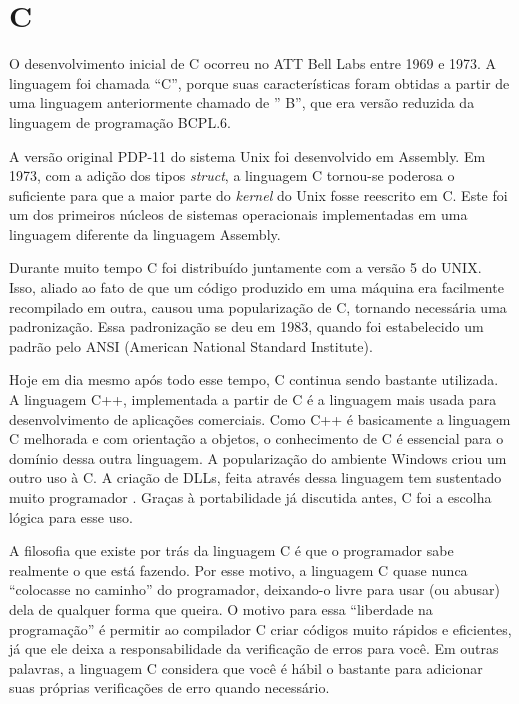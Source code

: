 \documentclass[
    12pt,               %
    openany,            %
    twoside,            %
    a4paper,            %
    brazil              %
    ]{abntex2}
\begin{document}
\chapter{C}

O desenvolvimento inicial de C ocorreu no ATT Bell Labs entre 1969 e 1973. A
linguagem foi chamada “C”, porque suas características foram obtidas a partir
de uma linguagem anteriormente chamado de ” B”, que era versão reduzida da
linguagem de programação BCPL.6.

A versão original PDP-11 do sistema Unix foi desenvolvido em Assembly. Em 1973,
com a adição dos tipos \textit{struct}, a linguagem C tornou-se poderosa o
suficiente para que a maior parte do \textit{kernel} do Unix fosse reescrito em
C. Este foi um dos primeiros núcleos de sistemas operacionais implementadas em
uma linguagem diferente da linguagem Assembly. 

Durante muito tempo C foi distribuído juntamente com a versão 5 do UNIX. Isso,
aliado ao fato de que um código produzido em uma máquina era facilmente
recompilado em outra, causou uma popularização de C, tornando necessária uma
padronização. Essa padronização se deu em 1983, quando foi estabelecido um
padrão pelo ANSI (American National Standard Institute).

Hoje em dia mesmo após todo esse tempo, C continua sendo bastante utilizada. A
linguagem C++, implementada a partir de C é a linguagem mais usada para
desenvolvimento de aplicações comerciais.  Como C++ é basicamente a linguagem C
melhorada e com orientação a objetos, o conhecimento de C é essencial para o
domínio dessa outra linguagem. A popularização do ambiente Windows criou um
outro uso à C. A criação de DLLs, feita através dessa linguagem tem sustentado
muito programador . Graças à portabilidade já discutida antes, C foi a escolha
lógica para esse uso.

A filosofia que existe por trás da linguagem C é que o programador sabe
realmente o que está fazendo.  Por esse motivo, a linguagem C quase nunca
“colocasse no caminho” do programador, deixando-o livre para usar (ou abusar)
dela de qualquer forma que queira. O motivo para essa “liberdade na
programação” é permitir ao compilador C criar códigos muito rápidos e
eficientes, já que ele deixa a responsabilidade da verificação de erros para
você. Em outras palavras, a linguagem C considera que você é hábil o bastante
para adicionar suas próprias verificações de erro quando necessário. 
\end{document}
